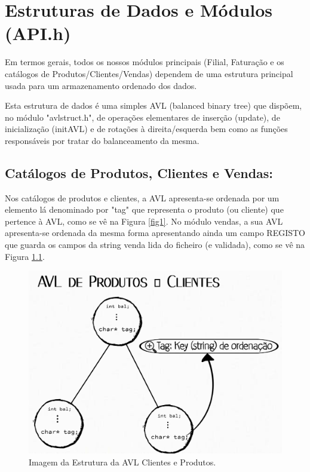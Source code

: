 \documentclass[a4paper,11pt]{report}
\begin{document}
\chapter{Estruturas de Dados e Módulos (API.h)}
\quad Em termos gerais, todos os nossos módulos principais (Filial, Faturação e os catálogos de Produtos/Clientes/Vendas) dependem de uma estrutura principal usada para um armazenamento ordenado dos dados.

\quad Esta estrutura de dados é uma simples AVL (balanced binary tree) que dispõem, no módulo "avlstruct.h", de operações elementares de inserção (update), de inicialização (initAVL) e de rotações à direita/esquerda bem como as funções responsáveis por tratar do balanceamento da mesma.


\section{Catálogos de Produtos, Clientes e Vendas:}

\quad Nos catálogos de produtos e clientes, a AVL apresenta-se ordenada por um elemento lá denominado por "tag" que representa o produto (ou cliente) que pertence à AVL, como se vê na Figura \ref{fig1}. No módulo vendas, a sua AVL apresenta-se ordenada da mesma forma apresentando ainda um campo REGISTO que guarda os campos da string venda lida do ficheiro (e validada), como se vê na Figura \ref{fig2}.

\begin{figure}[H]
  \centering
  \includegraphics[scale=0.2]{Avl_Prod_Cli.png}
  \caption{Imagem da Estrutura da AVL Clientes e Produtos.}
  \label{fig2}
\end{figure}
\end{document}
